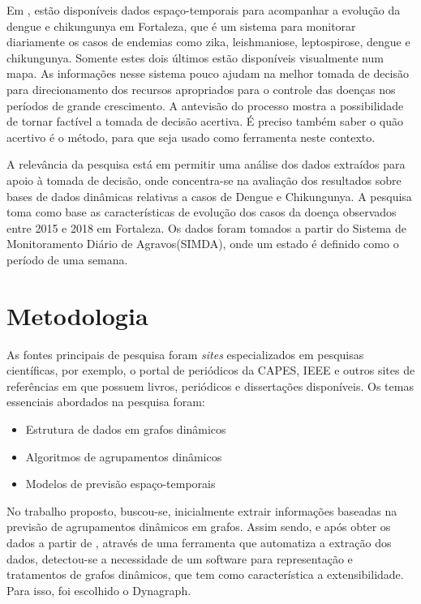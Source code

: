 Em \cite{simda}, estão disponíveis dados espaço-temporais para acompanhar a evolução da dengue e chikungunya em Fortaleza, que é um sistema para monitorar diariamente os casos de endemias como zika, leishmaniose, leptospirose, dengue e chikungunya. Somente estes dois últimos estão disponíveis visualmente num mapa. As informações nesse sistema pouco ajudam na melhor tomada de decisão para direcionamento dos recursos apropriados para o controle das doenças nos períodos de grande crescimento. A antevisão do processo mostra a possibilidade de tornar factível a tomada de decisão acertiva. É preciso também saber o quão acertivo é o método, para que seja usado como ferramenta neste contexto.

A relevância da pesquisa está em permitir uma análise dos dados extraídos 
para apoio à tomada de decisão, onde concentra-se na avaliação dos resultados sobre bases de dados
dinâmicas relativas a casos de Dengue e Chikungunya.
A pesquisa toma como base as características de evolução dos casos da doença
observados entre 2015 e 2018 em Fortaleza.
Os dados foram tomados a partir do Sistema de Monitoramento Diário de Agravos(SIMDA), onde um estado é definido como o período de uma semana. 

\section{Metodologia}

As fontes principais de pesquisa foram \textit{sites} especializados em pesquisas científicas, por exemplo, o portal de periódicos
da CAPES, IEEE e outros sites de referências em que possuem livros, periódicos e dissertações disponíveis.
Os temas essenciais abordados na pesquisa foram:
\begin{itemize}
	\item Estrutura de dados em grafos dinâmicos
	\item Algoritmos de agrupamentos dinâmicos
	\item Modelos de previsão espaço-temporais
\end{itemize}

No trabalho proposto, buscou-se, inicialmente extrair informações baseadas na previsão de agrupamentos dinâmicos
em grafos. Assim sendo, e após obter os dados a partir de \cite{simda}, através de uma ferramenta que automatiza a extração dos dados, detectou-se a necessidade de um software para representação e tratamentos de grafos dinâmicos, que tem como característica a extensibilidade. Para isso, foi escolhido o Dynagraph.

